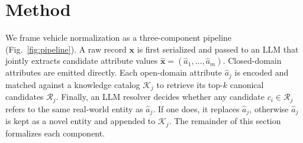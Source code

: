 \documentclass[conference]{IEEEtran}
\begin{document}
\section{Method}
\label{sec:method}

We frame vehicle normalization as a three-component pipeline
(Fig.~\ref{fig:pipeline}). A raw record $\mathbf{x}$ is first serialized
and passed to an LLM that jointly extracts candidate attribute values
$\hat{\mathbf{x}} = (\hat{a}_1, \dots, \hat{a}_m)$.
Closed-domain attributes are emitted directly. Each
open-domain attribute $\hat{a}_j$ is encoded and matched against a
knowledge catalog $\mathcal{K}_j$ to retrieve its top-$k$ canonical
candidates $\mathcal{R}_j$. Finally, an LLM resolver
decides whether any candidate $c_i \in \mathcal{R}_j$ refers to the same
real-world entity as $\hat{a}_j$. If one does, it replaces $\hat{a}_j$,
otherwise $\hat{a}_j$ is kept as a novel entity and appended to
$\mathcal{K}_j$. The remainder of this section formalizes each component.
\end{document}
